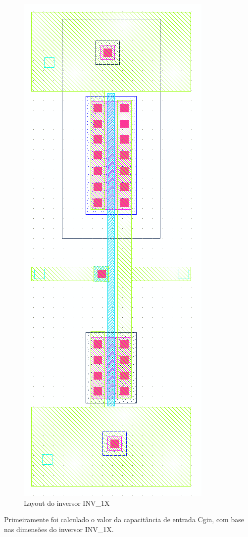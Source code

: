 \documentclass[a4paper,10pt] {article}
\begin{document}
\begin{figure}[h]
	\label{fig:inv}
	\centering
	\includegraphics[scale=0.3]{layout_inversor.png}
	\caption{Layout do inversor INV\_1X}
\end{figure}

Primeiramente foi calculado o valor da capacitância de entrada Cgin, com base nas dimensões do inversor INV\_1X.
\end{document}
